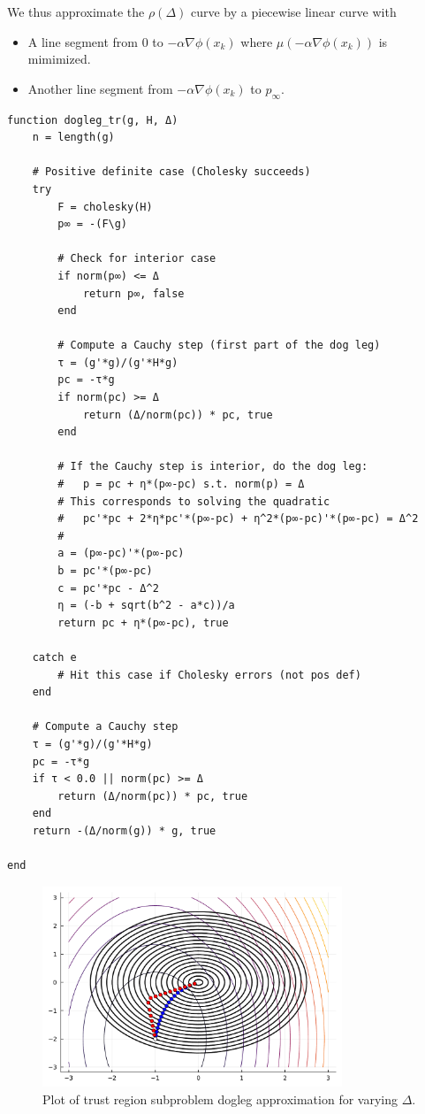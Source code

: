 \documentclass[12pt, leqno]{article} %
\providecommand{\tightlist}{%
  \setlength{\itemsep}{0pt}\setlength{\parskip}{0pt}}
\begin{document}
We thus approximate the \(\rho(\Delta)\) curve by a piecewise linear
curve with

\begin{itemize}
\tightlist
\item
  A line segment from \(0\) to \(-\alpha \nabla \phi(x_k)\) where
  \(\mu(-\alpha \nabla \phi(x_k))\) is mimimized.
\item
  Another line segment from \(-\alpha \nabla \phi(x_k)\) to
  \(p_{\infty}\).
\end{itemize}

\begin{verbatim}
function dogleg_tr(g, H, Δ)
    n = length(g)

    # Positive definite case (Cholesky succeeds)
    try
        F = cholesky(H)
        p∞ = -(F\g)
        
        # Check for interior case
        if norm(p∞) <= Δ
            return p∞, false
        end
        
        # Compute a Cauchy step (first part of the dog leg)
        τ = (g'*g)/(g'*H*g)
        pc = -τ*g
        if norm(pc) >= Δ
            return (Δ/norm(pc)) * pc, true
        end
        
        # If the Cauchy step is interior, do the dog leg:
        #   p = pc + η*(p∞-pc) s.t. norm(p) = Δ
        # This corresponds to solving the quadratic
        #   pc'*pc + 2*η*pc'*(p∞-pc) + η^2*(p∞-pc)'*(p∞-pc) = Δ^2
        #
        a = (p∞-pc)'*(p∞-pc)
        b = pc'*(p∞-pc)
        c = pc'*pc - Δ^2
        η = (-b + sqrt(b^2 - a*c))/a
        return pc + η*(p∞-pc), true

    catch e
        # Hit this case if Cholesky errors (not pos def)
    end    

    # Compute a Cauchy step
    τ = (g'*g)/(g'*H*g)
    pc = -τ*g
    if τ < 0.0 || norm(pc) >= Δ
        return (Δ/norm(pc)) * pc, true
    end
    return -(Δ/norm(g)) * g, true

end
\end{verbatim}

\begin{figure}
\begin{center}
  \includegraphics[width=0.8\textwidth]{fig/2023-04-19-demo-dogleg.pdf}
\end{center}
\caption{Plot of trust region subproblem dogleg approximation for 
  varying $\Delta$.}
\label{fig:demo-dogleg}
\end{figure}
\end{document}
